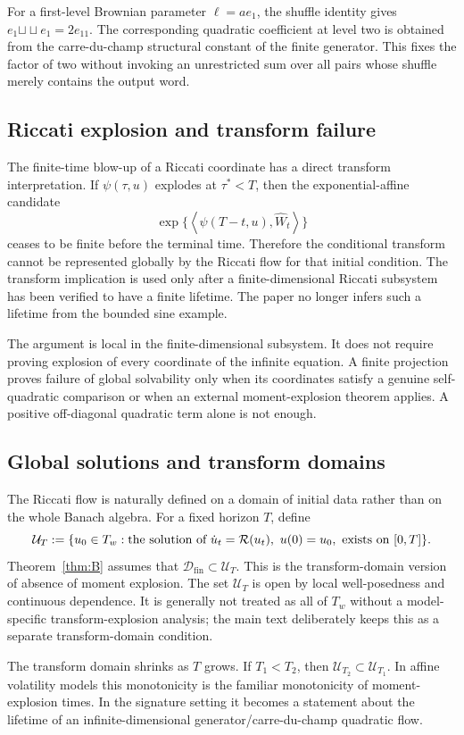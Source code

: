 \documentclass[11pt,oneside]{article}
\theoremstyle{plain}
\theoremstyle{definition}
\theoremstyle{remark}
\newcommand{\Tw}{T_w}
\newcommand{\cW}{\widehat W}
\newcommand{\Rs}{\mathcal R}
\newcommand{\sh}{\mathbin{\sqcup\!\sqcup}}
\newcommand{\inner}[2]{\left\langle #1,#2\right\rangle}
\begin{document}
For a first-level Brownian parameter $\ell=ae_1$, the shuffle identity gives $e_1\sh e_1=2e_{11}$. The corresponding quadratic coefficient at level two is obtained from the carre-du-champ structural constant of the finite generator. This fixes the factor of two without invoking an unrestricted sum over all pairs whose shuffle merely contains the output word.


\subsection*{Riccati explosion and transform failure}
The finite-time blow-up of a Riccati coordinate has a direct transform interpretation. If $\psi(\tau,u)$ explodes at $\tau^\ast<T$, then the exponential-affine candidate
\[
\exp\{\inner{\psi(T-t,u)}{\cW_t}\}
\]
ceases to be finite before the terminal time. Therefore the conditional transform cannot be represented globally by the Riccati flow for that initial condition. The transform implication is used only after a finite-dimensional Riccati subsystem has been verified to have a finite lifetime. The paper no longer infers such a lifetime from the bounded sine example.

The argument is local in the finite-dimensional subsystem. It does not require proving explosion of every coordinate of the infinite equation. A finite projection proves failure of global solvability only when its coordinates satisfy a genuine self-quadratic comparison or when an external moment-explosion theorem applies. A positive off-diagonal quadratic term alone is not enough.


\subsection*{Global solutions and transform domains}
The Riccati flow is naturally defined on a domain of initial data rather than on the whole Banach algebra. For a fixed horizon $T$, define
\[
\mathcal U_T:=\{u_0\in\Tw: \hbox{the solution of }\dot u_t=\Rs(u_t),\ u(0)=u_0,
\hbox{ exists on }[0,T]\}.
\]
Theorem~\ref{thm:B} assumes that $\mathcal D_{\mathrm{fin}}\subset\mathcal U_T$. This is the transform-domain version of absence of moment explosion. The set $\mathcal U_T$ is open by local well-posedness and continuous dependence. It is generally not treated as all of $\Tw$ without a model-specific transform-explosion analysis; the main text deliberately keeps this as a separate transform-domain condition.

The transform domain shrinks as $T$ grows. If $T_1<T_2$, then $\mathcal U_{T_2}\subset\mathcal U_{T_1}$. In affine volatility models this monotonicity is the familiar monotonicity of moment-explosion times. In the signature setting it becomes a statement about the lifetime of an infinite-dimensional generator/carre-du-champ quadratic flow.
\end{document}

